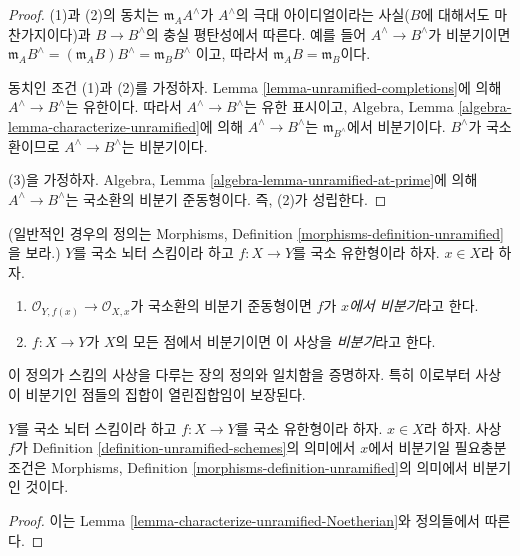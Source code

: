 \begin{proof}
(1)과 (2)의 동치는 $\mathfrak m_AA^\wedge$가 $A^\wedge$의 극대
아이디얼이라는 사실($B$에 대해서도 마찬가지이다)과
$B \to B^\wedge$의 충실 평탄성에서 따른다. 예를 들어
$A^\wedge \to B^\wedge$가 비분기이면
$\mathfrak m_AB^\wedge = (\mathfrak m_AB)B^\wedge = \mathfrak m_BB^\wedge$
이고, 따라서 $\mathfrak m_AB = \mathfrak m_B$이다.

\medskip\noindent
동치인 조건 (1)과 (2)를 가정하자. Lemma
\ref{lemma-unramified-completions}에 의해 $A^\wedge \to B^\wedge$는
유한이다. 따라서 $A^\wedge \to B^\wedge$는 유한 표시이고, Algebra,
Lemma \ref{algebra-lemma-characterize-unramified}에 의해
$A^\wedge \to B^\wedge$는 $\mathfrak m_{B^\wedge}$에서 비분기이다.
$B^\wedge$가 국소환이므로 $A^\wedge \to B^\wedge$는 비분기이다.

\medskip\noindent
(3)을 가정하자. Algebra, Lemma
\ref{algebra-lemma-unramified-at-prime}에 의해
$A^\wedge \to B^\wedge$는 국소환의 비분기 준동형이다. 즉, (2)가 성립한다.
\end{proof}

\begin{definition}
\label{definition-unramified-schemes}
(일반적인 경우의 정의는 Morphisms, Definition
\ref{morphisms-definition-unramified}을 보라.)
$Y$를 국소 뇌터 스킴이라 하고 $f : X \to Y$를 국소 유한형이라 하자.
$x \in X$라 하자.
\begin{enumerate}
\item $\mathcal{O}_{Y, f(x)} \to \mathcal{O}_{X, x}$가 국소환의
비분기 준동형이면 $f$가 {\it $x$에서 비분기}라고 한다.
\item $f : X \to Y$가 $X$의 모든 점에서 비분기이면 이 사상을
{\it 비분기}라고 한다.
\end{enumerate}
\end{definition}

\noindent
이 정의가 스킴의 사상을 다루는 장의 정의와 일치함을 증명하자.
특히 이로부터 사상이 비분기인 점들의 집합이 열린집합임이 보장된다.

\begin{lemma}
\label{lemma-unramified-definition}
$Y$를 국소 뇌터 스킴이라 하고 $f : X \to Y$를 국소 유한형이라 하자.
$x \in X$라 하자. 사상 $f$가 Definition
\ref{definition-unramified-schemes}의 의미에서 $x$에서 비분기일
필요충분조건은 Morphisms, Definition
\ref{morphisms-definition-unramified}의 의미에서 비분기인 것이다.
\end{lemma}

\begin{proof}
이는 Lemma \ref{lemma-characterize-unramified-Noetherian}와 정의들에서 따른다.
\end{proof}

